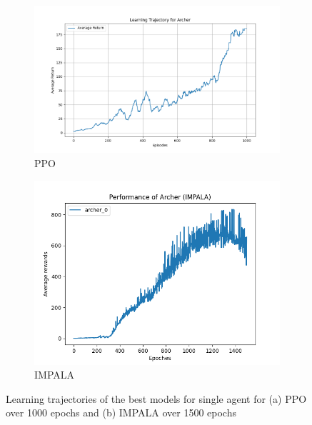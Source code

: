 \documentclass[12pt,a4paper, onecolumn]{exam}
\begin{document}
\begin{figure}[h]
    \centering
    \begin{subfigure}[b]{0.48\textwidth}
        \centering
        \includegraphics[width=\linewidth]{figures_latex/learning_trajectory_ppo_best.png}
        \caption{PPO}
        \label{fig:learning_trajectory_ppo_best}
    \end{subfigure}
    \hfill
    \begin{subfigure}[b]{0.48\textwidth}
        \centering
        \includegraphics[width=\linewidth]{figures_latex/lt_single_impala_best.png}
        \caption{IMPALA}
        \label{fig:learning_trajectory_impala_best}
    \end{subfigure}
    \caption{Learning trajectories of the best models for single agent for (a) PPO over 1000 epochs and (b) IMPALA over 1500 epochs}
    \label{fig:learning_trajectory_best_single}
\end{figure}
\end{document}
